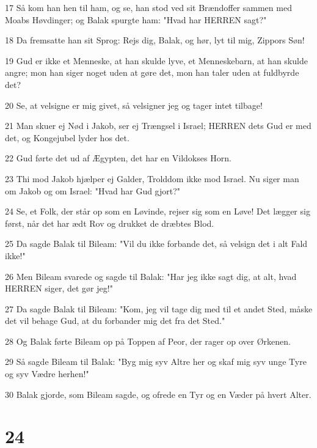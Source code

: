\par 17 Så kom han hen til ham, og se, han stod ved sit Brændoffer sammen med Moabs Høvdinger; og Balak spurgte ham: "Hvad har HERREN sagt?"
\par 18 Da fremsatte han sit Sprog: Rejs dig, Balak, og hør, lyt til mig, Zippors Søn!
\par 19 Gud er ikke et Menneske, at han skulde lyve, et Menneskebarn, at han skulde angre; mon han siger noget uden at gøre det, mon han taler uden at fuldbyrde det?
\par 20 Se, at velsigne er mig givet, så velsigner jeg og tager intet tilbage!
\par 21 Man skuer ej Nød i Jakob, ser ej Trængsel i Israel; HERREN dets Gud er med det, og Kongejubel lyder hos det.
\par 22 Gud førte det ud af Ægypten, det har en Vildokses Horn.
\par 23 Thi mod Jakob hjælper ej Galder, Trolddom ikke mod Israel. Nu siger man om Jakob og om Israel: "Hvad har Gud gjort?"
\par 24 Se, et Folk, der står op som en Løvinde, rejser sig som en Løve! Det lægger sig først, når det har ædt Rov og drukket de dræbtes Blod.
\par 25 Da sagde Balak til Bileam: "Vil du ikke forbande det, så velsign det i alt Fald ikke!"
\par 26 Men Bileam svarede og sagde til Balak: "Har jeg ikke sagt dig, at alt, hvad HERREN siger, det gør jeg!"
\par 27 Da sagde Balak til Bileam: "Kom, jeg vil tage dig med til et andet Sted, måske det vil behage Gud, at du forbander mig det fra det Sted."
\par 28 Og Balak førte Bileam op på Toppen af Peor, der rager op over Ørkenen.
\par 29 Så sagde Bileam til Balak: "Byg mig syv Altre her og skaf mig syv unge Tyre og syv Vædre herhen!"
\par 30 Balak gjorde, som Bileam sagde, og ofrede en Tyr og en Væder på hvert Alter.

\chapter{24}

